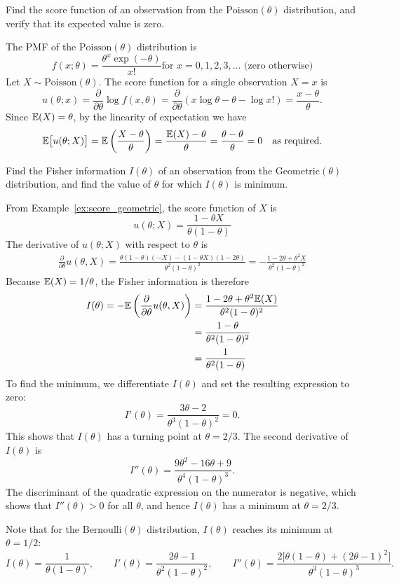 \begin{exercise}
\begin{questions}
\question %
Find the score function of an observation from the $\text{Poisson}(\theta)$ distribution, and verify that its expected value is zero.
\begin{answer}
The PMF of the $\text{Poisson}(\theta)$ distribution is
\[
f(x;\theta) = \displaystyle\frac{\theta^x\exp(-\theta)}{x!} \text{for $x=0,1,2,3,\ldots$ (zero otherwise)}
\]
Let $X\sim\text{Poisson}(\theta)$. The score function for a single observation $X=x$ is
\[
u(\theta;x)
	= \frac{\partial}{\partial\theta}\log f(x,\theta)
	= \frac{\partial}{\partial\theta}(x\log\theta - \theta - \log x!)
	= \frac{x-\theta}{\theta}.
\]
Since $\mathbb{E}(X)=\theta$, by the linearity of expectation we have
\[
\mathbb{E}\big[u(\theta;X)\big]
	= \mathbb{E}\left(\frac{X-\theta}{\theta}\right)
	= \frac{\mathbb{E}(X)-\theta}{\theta}
	= \frac{\theta-\theta}{\theta}
	= 0 \quad\text{as required.}
\]
\end{answer}
\question %
Find the Fisher information $I(\theta)$ of an observation from the $\text{Geometric}(\theta)$ distribution, and find the value of $\theta$ for which $I(\theta)$ is minimum.
\begin{answer}
From Example~\ref{ex:score_geometric}, the score function of $X$ is
\[
u(\theta;X) = \frac{1-\theta X}{\theta(1-\theta)}
\]
The derivative of $u(\theta;X)$ with respect to $\theta$ is
\begin{align*}
\frac{\partial}{\partial\theta} u(\theta,X)
	= \frac{\theta(1-\theta)(-X) - (1-\theta X)(1-2\theta)}{\theta^2(1-\theta)^2}
	= -\frac{1 - 2\theta +\theta^2X}{\theta^2(1-\theta)^2}
\end{align*}
Because $\mathbb{E}(X)=1/\theta$, the Fisher information is therefore
\begin{align*}
I(\theta)
	= -\mathbb{E}\left(\frac{\partial}{\partial\theta} u(\theta,X)\right)
	& = \frac{1 - 2\theta +\theta^2\mathbb{E}(X)}{\theta^2(1-\theta)^2} \\
	& = \frac{1 - \theta}{\theta^2(1-\theta)^2} \\
	& = \frac{1}{\theta^2(1-\theta)}
\end{align*}
To find the minimum, we differentiate $I(\theta)$ and set the resulting expression to zero:
\[
I'(\theta) = \frac{3\theta-2}{\theta^3(1-\theta)^2}	= 0.
\]
This shows that $I(\theta)$ has a turning point at $\theta=2/3$. The second derivative of $I(\theta)$ is
\[
I''(\theta) = \frac{9\theta^2 - 16\theta + 9}{\theta^4(1-\theta)^3}.
\]
The discriminant of the quadratic expression on the numerator is negative, which shows that $I''(\theta)>0$ for all $\theta$, and hence $I(\theta)$ has a minimum at $\theta=2/3$.  
\par\smallskip
Note that for the $\text{Bernoulli}(\theta)$ distribution, $I(\theta)$ reaches its minimum at $\theta=1/2$:
\[
I(\theta) = \frac{1}{\theta(1-\theta)},
\qquad
I'(\theta) = \frac{2\theta -1}{\theta^2(1-\theta)^2},
\qquad
I''(\theta) = \frac{2\big[\theta(1-\theta)+(2\theta-1)^2\big]}{\theta^3(1-\theta)^3}.
\]
\end{answer}
\end{questions}
\end{exercise}
